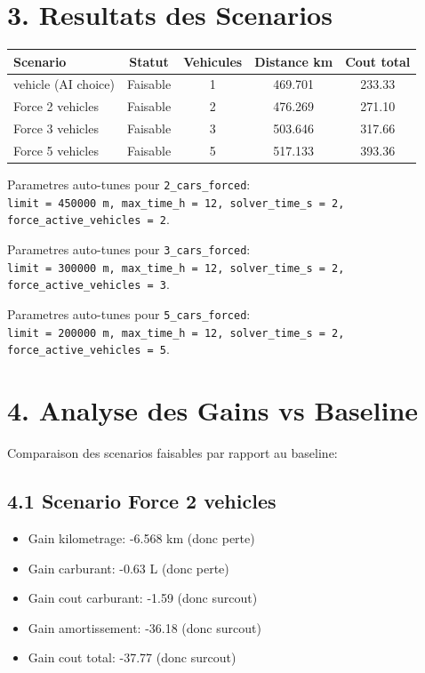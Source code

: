 \documentclass[12pt,a4paper]{article}
\begin{document}
\section*{3. Resultats des Scenarios}
\begin{longtable}{>{\raggedright\arraybackslash}p{4.3cm}cccc}
\toprule
\textbf{Scenario} & \textbf{Statut} & \textbf{Vehicules} & \textbf{Distance km} & \textbf{Cout total} \\
\midrule
1 vehicle (AI choice) & Faisable & 1 & 469.701 & 233.33 \\
Force 2 vehicles & Faisable & 2 & 476.269 & 271.10 \\
Force 3 vehicles & Faisable & 3 & 503.646 & 317.66 \\
Force 5 vehicles & Faisable & 5 & 517.133 & 393.36 \\
\bottomrule
\end{longtable}

Parametres auto-tunes pour \texttt{2\_cars\_forced}:\\
\texttt{limit = 450000 m, max\_time\_h = 12, solver\_time\_s = 2, force\_active\_vehicles = 2}.

Parametres auto-tunes pour \texttt{3\_cars\_forced}:\\
\texttt{limit = 300000 m, max\_time\_h = 12, solver\_time\_s = 2, force\_active\_vehicles = 3}.

Parametres auto-tunes pour \texttt{5\_cars\_forced}:\\
\texttt{limit = 200000 m, max\_time\_h = 12, solver\_time\_s = 2, force\_active\_vehicles = 5}.

\section*{4. Analyse des Gains vs Baseline}
Comparaison des scenarios faisables par rapport au baseline:
\subsection*{4.1 Scenario Force 2 vehicles}
\begin{itemize}
    \item Gain kilometrage: -6.568 km (donc perte)
    \item Gain carburant: -0.63 L (donc perte)
    \item Gain cout carburant: -1.59 (donc surcout)
    \item Gain amortissement: -36.18 (donc surcout)
    \item Gain cout total: -37.77 (donc surcout)
\end{itemize}
\end{document}
